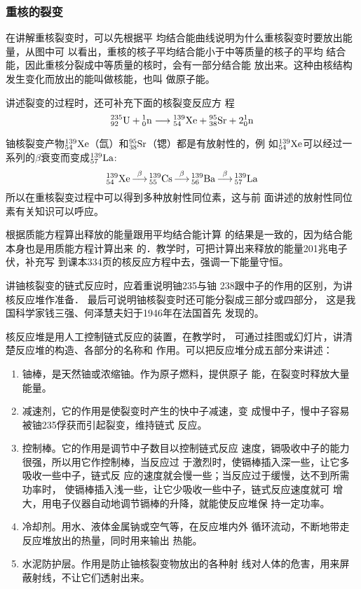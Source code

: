 \subsubsection{重核的裂变}

在讲解重核裂变时，可以先根据平
均结合能曲线说明为什么重核裂变时要放出能量，从图中可
以看出，重核的核子平均结合能小于中等质量的核子的平均
结合能，因此重核分裂成中等质量的核时，会有一部分结合能
放出来。这种由核结构发生变化而放出的能叫做核能，也叫
做原子能。

讲述裂变的过程时，还可补充下面的核裂变反应方
程
\[\atom{U}{235}{92}+\atom{n}{1}{0}\longrightarrow \atom{Xe}{139}{54}+\atom{Sr}{95}{38}+2\atom{n}{1}{0}\]

铀核裂变产物$\atom{Xe}{139}{54}$（氙）和$\atom{Sr}{95}{38}$（锶）都是有放射性的，例
如$\atom{Xe}{139}{54}$可以经过一系列的$\beta$衰变而变成$\atom{La}{139}{57}$:
\[\atom{Xe}{139}{54} \mathop{\longrightarrow}^{\beta}   \atom{Cs}{139}{55}  \mathop{\longrightarrow}^{\beta}    \atom{Ba}{139}{56}  \mathop{\longrightarrow}^{\beta}    \atom{La}{139}{57}\]
所以在重核裂变过程中可以得到多种放射性同位素，这与前
面讲述的放射性同位素有关知识可以呼应。

根据质能方程算出释放的能量跟用平均结合能计算
的结果是一致的，因为结合能本身也是用质能方程计算出来
的．教学时，可把计算出来释放的能量201兆电子伏，补充写
到课本334页的核反应方程中去，强调一下能量守恒。

讲铀核裂变的链式反应时，应着重说明铀235与铀
238跟中子的作用的区别，为讲核反应堆作准备．
最后可说明铀核裂变时还可能分裂成三部分或四部分，
这是我国科学家钱三强、何泽慧夫妇于1946年在法国首先
发现的。

核反应堆是用人工控制链式反应的装置，在教学时，
可通过挂图或幻灯片，讲清楚反应堆的构造、各部分的名称和
作用。可以把反应堆分成五部分来讲述：
\begin{enumerate}
\item 铀棒，是天然铀或浓缩铀。作为原子燃料，提供原子
能，在裂变时释放大量能量。
\item 减速剂，它的作用是使裂变时产生的快中子减速，变
成慢中子，慢中子容易被铀235俘获而引起裂变，维持链式
反应。
\item 控制棒。它的作用是调节中子数目以控制链式反应
速度，镉吸收中子的能力很强，所以用它作控制棒，当反应过
于激烈时，使镉棒插入深一些，让它多吸收一些中子，链式反
应的速度就会慢一些；当反应过于缓慢，达不到所需功率时，
使镉棒插入浅一些，让它少吸收一些中子，链式反应速度就可
增大，用电子仪器自动地调节镉棒的升降，就能使反应堆保
持一定功率。
\item 冷却剂。用水、液体金属钠或空气等，在反应堆内外
循环流动，不断地带走反应堆放出的热量，同时用来输出
热能。
\item 水泥防护层。作用是防止铀核裂变物放出的各种射
线对人体的危害，用来屏蔽射线，不让它们透射出来。
\end{enumerate}

